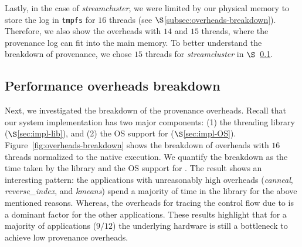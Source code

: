 Lastly, in the case of {\em streamcluster}, we were limited by our physical memory to store the log in {\tt tmpfs} for $16$ threads (see $\S$\ref{subsec:overheads-breakdown}). Therefore, we also show the overheads with $14$ and $15$ threads,  where the provenance log can fit into the main memory.  To better understand the breakdown of provenance, we chose $15$ threads for {\em streamcluster} in $\S$~\ref{subsec:performance-overheads-breakdown}.



%


%



\subsection{Performance overheads breakdown} 
\label{subsec:performance-overheads-breakdown}

Next, we investigated the breakdown of the provenance overheads. Recall that our system implementation has two major components: (1) the threading library ($\S$\ref{sec:impl-lib}), and (2) the OS support for \intelpt ($\S$\ref{sec:impl-OS}). 
Figure~\ref{fig:overheads-breakdown} shows the breakdown of overheads with $16$ threads normalized to the native \pthreads execution. We quantify the breakdown as the time taken by the \projecttitle library  and the OS support for \intelpt  . The result shows an interesting pattern: the applications with unreasonably high overheads ({\em canneal}, {\em reverse\_index}, and {\em kmeans}) spend a majority of time in the \projecttitle library for the above mentioned reasons. Whereas, the overheads for tracing the control flow due to \intelpt  is a dominant factor for the other applications. These results highlight that for a majority of applications ($9/12$) the underlying hardware is still a bottleneck to achieve low provenance overheads.  


